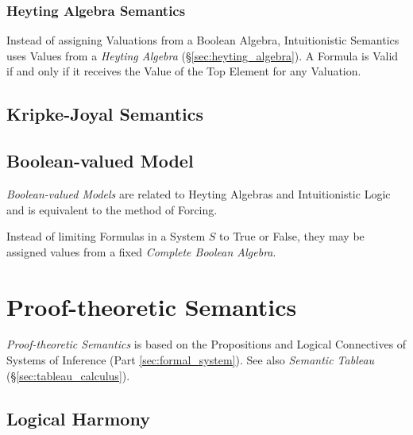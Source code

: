 \subsubsection{Heyting Algebra Semantics}\label{sec:heyting_semantics}

Instead of assigning Valuations from a Boolean Algebra, Intuitionistic
Semantics uses Values from a \emph{Heyting Algebra}
(\S\ref{sec:heyting_algebra}). A Formula is Valid if and only if it
receives the Value of the Top Element for any Valuation.

\subsection{Kripke-Joyal Semantics}

\subsection{Boolean-valued Model}

\emph{Boolean-valued Models} are related to Heyting Algebras and
Intuitionistic Logic and is equivalent to the method of Forcing.

Instead of limiting Formulas in a System $S$ to True or False, they
may be assigned values from a fixed \emph{Complete Boolean Algebra}.



\section{Proof-theoretic Semantics}

\emph{Proof-theoretic Semantics} is based on the Propositions and
Logical Connectives of Systems of Inference (Part
\ref{sec:formal_system}). See also \emph{Semantic Tableau}
(\S\ref{sec:tableau_calculus}).



\subsection{Logical Harmony} \label{sec:logical_harmony}


